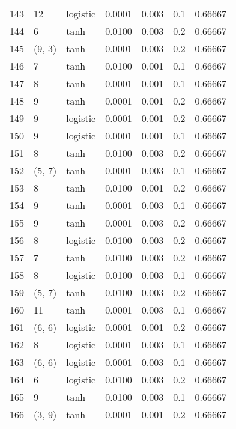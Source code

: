 \begin{tabular}{lllrrrr}
143 &          12 &  logistic &  0.0001 &  0.003 &  0.1 &   0.66667 \\
144 &           6 &      tanh &  0.0100 &  0.003 &  0.2 &   0.66667 \\
145 &      (9, 3) &      tanh &  0.0001 &  0.003 &  0.2 &   0.66667 \\
146 &           7 &      tanh &  0.0100 &  0.001 &  0.1 &   0.66667 \\
147 &           8 &      tanh &  0.0001 &  0.001 &  0.1 &   0.66667 \\
148 &           9 &      tanh &  0.0001 &  0.001 &  0.2 &   0.66667 \\
149 &           9 &  logistic &  0.0001 &  0.001 &  0.2 &   0.66667 \\
150 &           9 &  logistic &  0.0001 &  0.001 &  0.1 &   0.66667 \\
151 &           8 &      tanh &  0.0100 &  0.003 &  0.2 &   0.66667 \\
152 &      (5, 7) &      tanh &  0.0001 &  0.003 &  0.1 &   0.66667 \\
153 &           8 &      tanh &  0.0100 &  0.001 &  0.2 &   0.66667 \\
154 &           9 &      tanh &  0.0001 &  0.003 &  0.1 &   0.66667 \\
155 &           9 &      tanh &  0.0001 &  0.003 &  0.2 &   0.66667 \\
156 &           8 &  logistic &  0.0100 &  0.003 &  0.2 &   0.66667 \\
157 &           7 &      tanh &  0.0100 &  0.003 &  0.2 &   0.66667 \\
158 &           8 &  logistic &  0.0100 &  0.003 &  0.1 &   0.66667 \\
159 &      (5, 7) &      tanh &  0.0100 &  0.003 &  0.2 &   0.66667 \\
160 &          11 &      tanh &  0.0001 &  0.003 &  0.1 &   0.66667 \\
161 &      (6, 6) &  logistic &  0.0001 &  0.001 &  0.2 &   0.66667 \\
162 &           8 &  logistic &  0.0001 &  0.003 &  0.1 &   0.66667 \\
163 &      (6, 6) &  logistic &  0.0001 &  0.003 &  0.1 &   0.66667 \\
164 &           6 &  logistic &  0.0100 &  0.003 &  0.2 &   0.66667 \\
165 &           9 &      tanh &  0.0100 &  0.003 &  0.1 &   0.66667 \\
166 &      (3, 9) &      tanh &  0.0001 &  0.001 &  0.2 &   0.66667 \\

\end{tabular}
